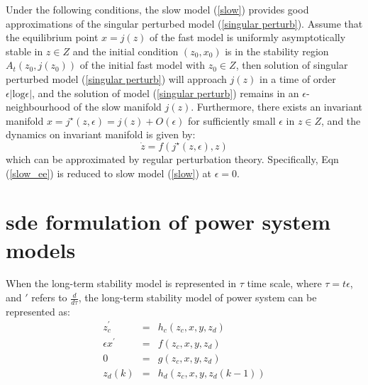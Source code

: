 \documentclass[journal]{IEEEtran}
\newcommand{\ee}{\epsilon}
\begin{document}
Under the following conditions, the slow model (\ref{slow}) provides good approximations of the singular perturbed model (\ref{singular perturb}).
Assume that the equilibrium point $x=j(z)$ of the fast model is uniformly asymptotically stable in $z\in Z$ and the initial condition $(z_0,x_0)$ is in the stability region $A_t(z_0,j(z_0))$ of the initial fast model with $z_0\in Z$, then solution of singular perturbed model (\ref{singular perturb}) will approach $j(z)$ in a time of order $\ee|\mbox{log}\ee|$, and the solution of model (\ref{singular perturb}) remains in an $\ee$-neighbourhood of the slow manifold $j(z)$\cite{Khalil:book}\cite{Gentz:2003}. Furthermore, there exists an invariant manifold $x={j^\star}(z,\ee)=j(z)+O(\ee)$ for sufficiently small $\ee$ in $z\in Z$\cite{Khalil:book}\cite{Fenichel:1979}, and the dynamics on invariant manifold is given by:
\begin{equation}\label{slow_ee}
\dot{z}=f({j^\star}(z,\ee),z)
\end{equation}
which can be approximated by regular perturbation theory. Specifically, Eqn (\ref{slow_ee}) is reduced to slow model (\ref{slow}) at $\ee=0$.














\section{sde formulation of power system models}\label{sectionmodels}

When the long-term stability model is represented in $\tau$ time scale, where $\tau=t\ee$, and $\prime$ refers to $\frac{d}{d\tau}$, the long-term stability model of power system can be represented as:
\begin{eqnarray}\label{complete}
{z}_{c}^\prime&=&{h}_c({z_c,x,y,z_d})\label{complete_1}\\\ee{x}^\prime&=&{f}({z_c,x,y,z_d})\\{0}&=&{g}({z_c,x,y,z_d})\label{complete_2}\\z_d(k)&=&h_d(z_c,x,y,z_d(k-1))\label{complete}
\end{eqnarray}
\end{document}
